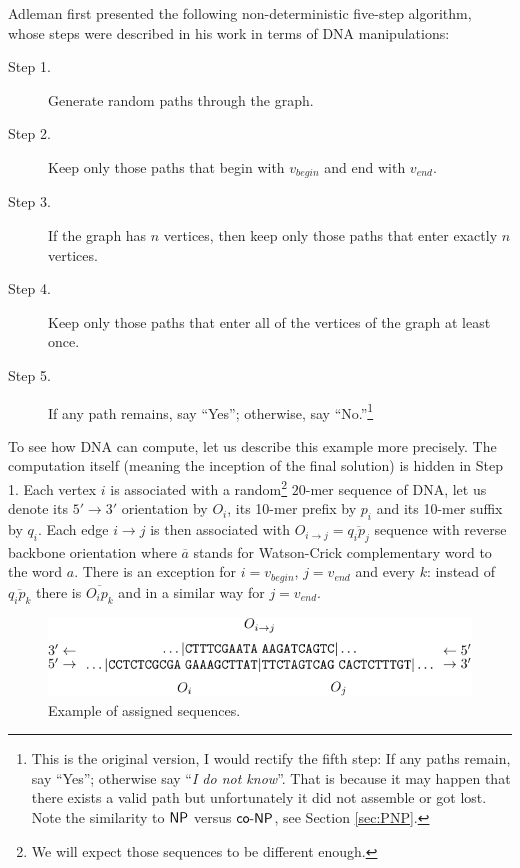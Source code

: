		Adleman first presented the following non-deterministic five-step algorithm, whose steps were described in his work in terms of DNA manipulations:
		\begin{description}
			\item[Step 1.] Generate random paths through the graph.
			\item[Step 2.] Keep only those paths that begin with $v_{begin}$ and end with $v_{end}$.
			\item[Step 3.] If the graph has $n$ vertices, then keep only those paths that enter exactly $n$ vertices.
			\item[Step 4.] Keep only those paths that enter all of the vertices of the graph at least once.
			\item[Step 5.] If any path remains, say ``Yes''; otherwise, say ``No.''\footnote{This is the original version, I would rectify the fifth step: If any paths remain, say ``Yes''; otherwise say ``{\em I do not know}''. That is because it may happen that there exists a valid path but unfortunately it did not assemble or got lost. Note the similarity to $\mathsf{NP}$ versus $\mathsf{co}\textnormal{-}\mathsf{NP}$, see Section \ref{sec:PNP}.} %
		\end{description}
		To see %
		how DNA can compute, let us describe this example more precisely. The computation itself (meaning the inception of the final solution) is hidden in Step 1. Each vertex $i$ is associated with a random\footnote{We will expect those sequences to be different enough.} $20$-mer sequence of DNA, let us denote its $5'\rightarrow 3'$ orientation by $O_i$, its 10-mer prefix by $p_i$ and its 10-mer suffix by $q_i$. Each edge $i\rightarrow j$ is then associated with $O_{i\rightarrow j} = \overline{q_i p_j}$ sequence with reverse backbone orientation where $\overline{a}$ stands for Watson-Crick complementary word to the word $a$. There is an exception for $i=v_{begin}$, $j=v_{end}$ and every $k$: instead of $\overline{q_i p_k}$ there is $\overline{O_i p_k}$ and in a similar way for $j=v_{end}$.
		
		\begin{figure}[h]
		\begin{center}
			\includegraphics{./figures/adleman_strands.pdf}
			\caption{Example of assigned sequences.}
			\label{fig:adleman_strands}
		\end{center}
		\end{figure}
		
